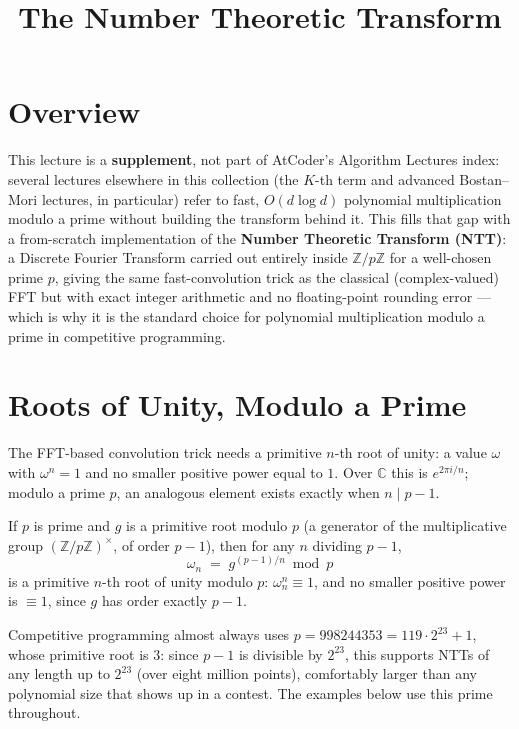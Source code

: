 \documentclass[11pt]{article}
\title{The Number Theoretic Transform}
\author{}
\date{}
\begin{document}
\thispagestyle{fancy}


\section{Overview}
This lecture is a \textbf{supplement}, not part of AtCoder's Algorithm
Lectures index: several lectures elsewhere in this collection (the
$K$-th term and advanced Bostan--Mori lectures, in particular) refer to
fast, $O(d \log d)$ polynomial multiplication modulo a prime without
building the transform behind it. This fills that gap with a
from-scratch implementation of the \textbf{Number Theoretic Transform
(NTT)}: a Discrete Fourier Transform carried out entirely inside
$\mathbb{Z}/p\mathbb{Z}$ for a well-chosen prime $p$, giving the same
fast-convolution trick as the classical (complex-valued) FFT but with
exact integer arithmetic and no floating-point rounding error --- which
is why it is the standard choice for polynomial multiplication modulo a
prime in competitive programming.

\section{Roots of Unity, Modulo a Prime}
The FFT-based convolution trick needs a primitive $n$-th root of unity:
a value $\omega$ with $\omega^n = 1$ and no smaller positive power equal
to $1$. Over $\mathbb{C}$ this is $e^{2\pi i/n}$; modulo a prime $p$, an
analogous element exists exactly when $n \mid p - 1$.

\begin{definitionbox}
If $p$ is prime and $g$ is a primitive root modulo $p$ (a generator of
the multiplicative group $(\mathbb{Z}/p\mathbb{Z})^\times$, of order
$p-1$), then for any $n$ dividing $p-1$,
\[
  \omega_n \;=\; g^{(p-1)/n} \bmod p
\]
is a primitive $n$-th root of unity modulo $p$: $\omega_n^n \equiv 1$,
and no smaller positive power is $\equiv 1$, since $g$ has order exactly
$p-1$.
\end{definitionbox}

Competitive programming almost always uses
$p = 998244353 = 119 \cdot 2^{23} + 1$, whose primitive root is $3$: since
$p - 1$ is divisible by $2^{23}$, this supports NTTs of any length up to
$2^{23}$ (over eight million points), comfortably larger than any
polynomial size that shows up in a contest. The examples below use this
prime throughout.
\end{document}
